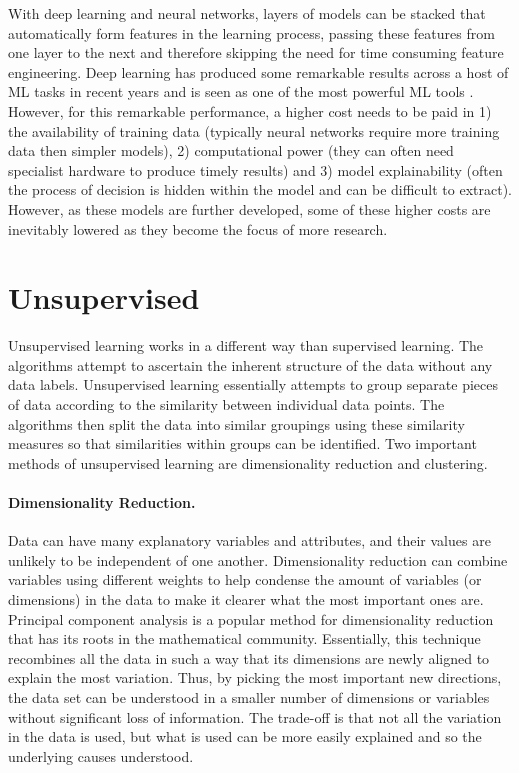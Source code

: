 With deep learning and neural networks, layers of models can be stacked that automatically form features in the learning process, passing these features from one layer to the next and therefore skipping the need for time consuming feature engineering. Deep learning has produced some remarkable results across a host of ML tasks in recent years and is seen as one of the most powerful ML tools \parencite{lecun2015deep}. However, for this remarkable performance, a higher cost needs to be paid in 1) the availability of training data (typically neural networks require more training data then simpler models), 2) computational power (they can often need specialist hardware to produce timely results) and 3) model explainability (often the process of decision is hidden within the model and can be difficult to extract). However, as these models are further developed, some of these higher costs are inevitably lowered as they become the focus of more research.


\section{Unsupervised} Unsupervised learning works in a different way than supervised learning. The algorithms attempt to ascertain the inherent structure of the data without any data labels. Unsupervised learning essentially attempts to group separate pieces of data according to the similarity between individual data points. The algorithms then split the data into similar groupings using these similarity measures so that similarities within groups can be identified. Two important methods of unsupervised learning are dimensionality reduction and clustering.


\paragraph{Dimensionality Reduction.} Data can have many explanatory variables and attributes, and their values are unlikely to be independent of one another. Dimensionality reduction can combine variables using different weights to help condense the amount of variables (or dimensions) in the data to make it clearer what the most important ones are. Principal component analysis is a popular method for dimensionality reduction that has its roots in the mathematical community. Essentially, this technique recombines all the data in such a way that its dimensions are newly aligned to explain the most variation. Thus, by picking the most important new directions, the data set can be understood in a smaller number of dimensions or variables without significant loss of information. The trade-off is that not all the variation in the data is used, but what is used can be more easily explained and so the underlying causes understood.


